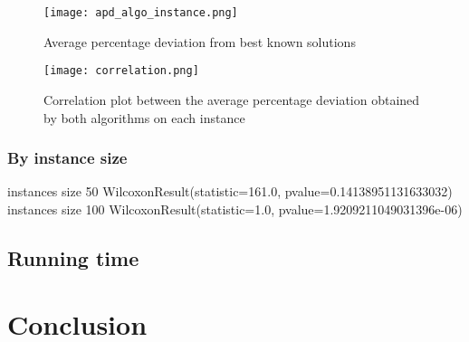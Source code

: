 \documentclass[a4paper,10pt]{article}
\begin{document}
\begin{figure}[H]
	\centering
	\caption{Average percentage deviation from best known solutions}
	\texttt{[image: apd\_algo\_instance.png]}
\end{figure}


\begin{figure}[H]
	\centering
	\caption{Correlation plot between the average percentage deviation obtained by both algorithms on each instance}
	\texttt{[image: correlation.png]}
\end{figure}



\subsubsection{By instance size}

instances size 50
WilcoxonResult(statistic=161.0, pvalue=0.14138951131633032)
instances size 100
WilcoxonResult(statistic=1.0, pvalue=1.9209211049031396e-06)

\subsection{Running time}

\section{Conclusion}
\end{document}
